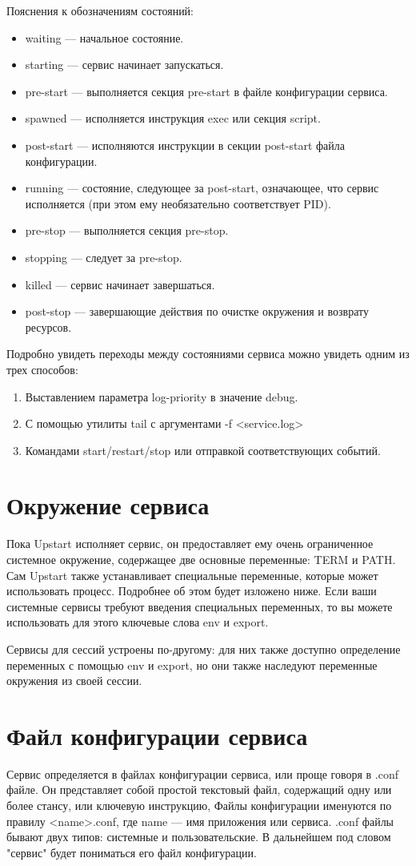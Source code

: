 Пояснения к обозначениям состояний: \begin{itemize}
\item waiting --- начальное состояние.
\item starting --- сервис начинает запускаться.
\item pre-start --- выполняется секция pre-start в файле конфигурации сервиса.
\item spawned --- исполняется инструкция exec или секция script.
\item post-start --- исполняются инструкции в секции post-start файла конфигурации.
\item running --- состояние, следующее за post-start, означающее, что сервис исполняется (при этом ему необязательно соответствует PID).
\item pre-stop --- выполняется секция pre-stop.
\item stopping --- следует за pre-stop. 
\item killed --- сервис начинает завершаться.
\item post-stop --- завершающие действия по очистке окружения и возврату ресурсов.
\end{itemize}

Подробно увидеть переходы между состояниями сервиса можно увидеть одним из трех способов: \begin{enumerate}
\item Выставлением параметра log-priority в значение debug.
\item С помощью утилиты tail с аргументами -f <service.log>
\item Командами start/restart/stop или отправкой соответствующих событий.
\end{enumerate}
\section{Окружение сервиса}
Пока Upstart исполняет сервис, он предоставляет ему очень ограниченное системное окружение, 
содержащее две основные переменные: TERM и PATH. Сам Upstart также устанавливает специальные переменные, которые может использовать процесс. Подробнее об этом будет изложено ниже. Если ваши системные сервисы 
требуют введения специальных переменных, то вы можете использовать для этого ключевые слова env и export.

Сервисы для сессий устроены по-другому: для них также доступно определение переменных с помощью env и export, но они также наследуют переменные окружения из своей сессии.
\section{Файл конфигурации сервиса}
Сервис определяется в файлах конфигурации сервиса, или проще говоря в .conf файле. Он представляет собой простой текстовый файл, содержащий одну или более стансу, или ключевую инструкцию, Файлы конфигурации именуются по правилу <name>.conf, где  name --- имя приложения или сервиса. .conf файлы бывают двух типов: 
системные и пользовательские. В дальнейшем под словом "сервис" будет пониматься его файл конфигурации.

